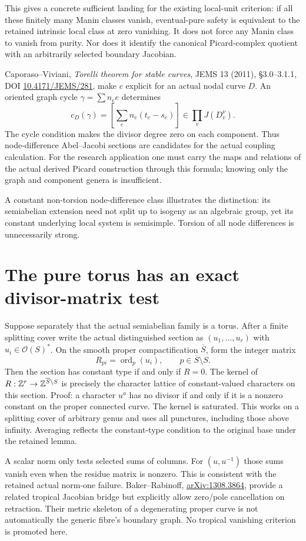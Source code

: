 \documentclass{article}
\begin{document}
This gives a concrete sufficient landing for the existing local-unit criterion: if all these finitely many Manin classes vanish, eventual-pure safety is equivalent to the retained intrinsic local class at zero vanishing. It does not force any Manin class to vanish from purity. Nor does it identify the canonical Picard-complex quotient with an arbitrarily selected boundary Jacobian.

Caporaso--Viviani, \emph{Torelli theorem for stable curves}, JEMS 13 (2011), \S3.0--3.1.1, DOI \href{https://doi.org/10.4171/JEMS/281}{10.4171/JEMS/281}, make $c$ explicit for an actual nodal curve $D$. An oriented graph cycle $\gamma=\sum n_e e$ determines
\[
 c_D(\gamma)=\left[\sum_e n_e(t_e-s_e)\right]\in\prod_v J(D_v^\nu).
\]
The cycle condition makes the divisor degree zero on each component. Thus node-difference Abel--Jacobi sections are candidates for the actual coupling calculation. For the research application one must carry the maps and relations of the actual derived Picard construction through this formula; knowing only the graph and component genera is insufficient.

A constant non-torsion node-difference class illustrates the distinction: its semiabelian extension need not split up to isogeny as an algebraic group, yet its constant underlying local system is semisimple. Torsion of all node differences is unnecessarily strong.

\section{The pure torus has an exact divisor-matrix test}
Suppose separately that the actual semiabelian family is a torus. After a finite splitting cover write the actual distinguished section as $(u_1,\ldots,u_r)$ with $u_i\in\mathcal O(S)^*$. On the smooth proper compactification $\overline S$, form the integer matrix
\[
 R_{p i}=\operatorname{ord}_p(u_i),\qquad p\in\overline S\setminus S.
\]
Then the section has constant type if and only if $R=0$. The kernel of $R:\mathbb Z^r\to\mathbb Z^{\overline S\setminus S}$ is precisely the character lattice of constant-valued characters on this section. Proof: a character $u^a$ has no divisor if and only if it is a nonzero constant on the proper connected curve. The kernel is saturated. This works on a splitting cover of arbitrary genus and uses all punctures, including those above infinity. Averaging reflects the constant-type condition to the original base under the retained lemma.

A scalar norm only tests selected sums of columns. For $(u,u^{-1})$ those sums vanish even when the residue matrix is nonzero. This is consistent with the retained actual norm-one failure. Baker--Rabinoff, \href{https://arxiv.org/abs/1308.3864}{arXiv:1308.3864}, provide a related tropical Jacobian bridge but explicitly allow zero/pole cancellation on retraction. Their metric skeleton of a degenerating proper curve is not automatically the generic fibre's boundary graph. No tropical vanishing criterion is promoted here.
\end{document}
